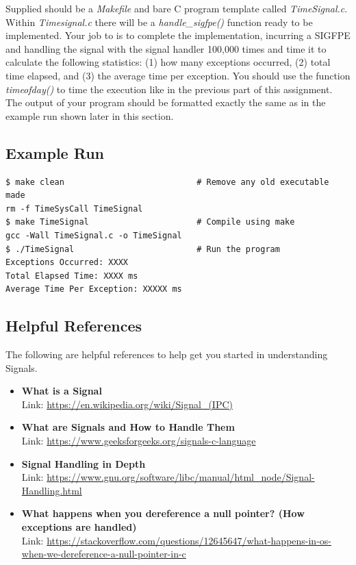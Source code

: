 \documentclass{article}
\begin{document}
Supplied should be a \textit{Makefile} and bare C program template called \textit{TimeSignal.c}. Within \textit{Timesignal.c} there will be a \textit{handle\_sigfpe()} function ready to be implemented. Your job to is to complete the implementation, incurring a SIGFPE and handling the signal with the signal handler 100,000 times and time it to calculate the following statistics: (1) how many exceptions occurred, (2) total time elapsed, and (3) the average time per exception. You should use the function \textit{timeofday()} to time the execution like in the previous part of this assignment. The output of your program should be formatted exactly the same as in the example run shown later in this section.\\


\subsection*{Example Run}
\begin{commandline}
\begin{verbatim}
$ make clean                           # Remove any old executable made
rm -f TimeSysCall TimeSignal
$ make TimeSignal                      # Compile using make
gcc -Wall TimeSignal.c -o TimeSignal
$ ./TimeSignal                         # Run the program
Exceptions Occurred: XXXX
Total Elapsed Time: XXXX ms
Average Time Per Exception: XXXXX ms
\end{verbatim}
\end{commandline}


\subsection*{Helpful References}
The following are helpful references to help get you started in understanding Signals.
\begin{itemize}
\item \textbf{What is a Signal} \\
Link:  \href{https://en.wikipedia.org/wiki/Signal_(IPC)}{https://en.wikipedia.org/wiki/Signal\_(IPC)}
\item \textbf{What are Signals and How to Handle Them}\\
Link:  \href{https://www.geeksforgeeks.org/signals-c-language}{https://www.geeksforgeeks.org/signals-c-language}
\item \textbf{Signal Handling in Depth}\\
Link:  \href{https://www.gnu.org/software/libc/manual/html_node/Signal-Handling.html}{https://www.gnu.org/software/libc/manual/html\_node/Signal-Handling.html}
\item \textbf{What happens when you dereference a null pointer? (How exceptions are handled)}\\
Link:  \href{https://stackoverflow.com/questions/12645647/what-happens-in-os-when-we-dereference-a-null-pointer-in-c}{https://stackoverflow.com/questions/12645647/what-happens-in-os-when-we-dereference-a-null-pointer-in-c}
\end{itemize}
\end{document}
